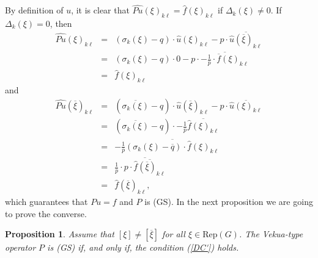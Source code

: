 \documentclass[sn-mathphys-num]{sn-jnl}%
\numberwithin{equation}{section}
\theoremstyle{thmstyleone}
\newtheorem{proposition}[theorem]{Proposition}
\theoremstyle{thmstyletwo}
\theoremstyle{thmstylethree}
\begin{document}
By definition of $u$, it is clear that $\widehat{Pu}(\xi)_{k\ell}=\widehat{f}(\xi)_{k\ell}$ if $\Delta_k(\xi)\neq 0$. If $\Delta_k(\xi)=0$, then
\begin{eqnarray*} \widehat{Pu}(\xi)_{k\ell} & = & (\sigma_k(\xi)-q) \cdot \widehat{u}(\xi)_{k\ell}- p \cdot \overline{\widehat{u}(\overline{\xi})_{k\ell}} \\
	& = & (\sigma_k(\xi)-q) \cdot 0 -p \cdot \overline{ -\frac{1}{\overline{p}}\cdot \overline{f}(\xi)_{k\ell} } \\
	& = & \widehat{f}(\xi)_{k\ell}
\end{eqnarray*} 	
and
\begin{eqnarray*} \widehat{Pu}(\overline{\xi})_{k\ell} & = & (\overline{\sigma_k(\xi)}-q)\cdot \widehat{u}(\overline{\xi})_{k\ell} - p \cdot \overline{ \widehat{u}(\xi)_{k\ell}} \\
	& = & (\overline{\sigma_k(\xi)}-q)\cdot -\frac{1}{\overline{p}} \overline{ \widehat{f}(\xi)_{k\ell}} \\
	& = & -\frac{1}{\overline{p}} \overline{ (\sigma_k(\xi)-\overline{q})\cdot \widehat{f}(\xi)_{k\ell} } \\
	& = &  \frac{1}{\overline{p}}\cdot \overline{ p \cdot \overline{\widehat{f}(\overline{\xi})_{k\ell}}} \\
	& = & \widehat{f}(\overline{\xi})_{k\ell}, 
\end{eqnarray*} 
which guarantees that $Pu=f$ and $P$ is (GS). In the next proposition we are going to prove the converse.

\begin{proposition}\label{GSconstant} Assume that $[\xi] \neq [\overline{\xi}]$ for all $\xi \in \textrm{Rep}(G)$. The Vekua-type operator $P$ is (GS) if, and only if, the condition (\ref{DC'}) holds.
\end{proposition}
\end{document}
